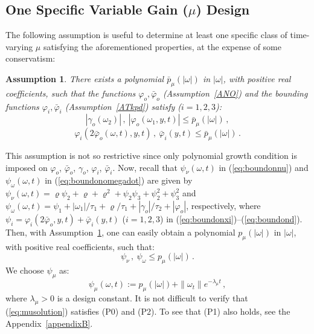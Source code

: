\documentclass{rncauth}
\newtheorem{assumption}{Assumption}
\begin{document}
\subsection{One Specific Variable Gain ($\mu$) Design \label{sec:poly}}

The following assumption is useful to determine at least one
specific class of time-varying $\mu$ satisfying the aforementioned
properties, at the expense of some conservatism:
%
%
\begin{assumption}\label{Amu}
There exists a polynomial $\bar{p}_\mu(|\omega|)$ in $|\omega|$,
with positive real coefficients, such that the functions
$\varphi_o, \bar{\varphi}_o$ (Assumption~\ref{ANO}) and the
bounding functions $\varphi_i, \bar{\varphi}_i$
(Assumption~\ref{ATkpd}) satisfy ($i=1,2,3$):
%
$$|\gamma_o(\omega_2)|\,,\
|\varphi_o(\omega_1,y,t)| \leq \bar{p}_\mu(|\omega|)\,,$$
%
$$\varphi_i(2\bar{\varphi}_o(\omega,t),y,t)\,,\ \bar{\varphi}_i(y,t)\leq \bar{p}_\mu(|\omega|)\,.$$
%
\end{assumption}
%
This assumption is not so restrictive since only polynomial growth
condition is imposed on $\varphi_o$, $\bar{\varphi}_o$,
$\gamma_o$, $\varphi_i$, $\bar{\varphi}_i$.
%
Now, recall that $\psi_\nu(\omega,t)$ in (\ref{eq:boundonnu}) and
$\psi_\omega(\omega,t)$ in (\ref{eq:boundonomegadot}) are given by
$\psi_\nu(\omega,t)=\varrho \psi_2+ \varrho+
\varrho^2+\psi_2\psi_3+\psi_2^2 + \psi_3^2$ and
$\psi_\omega(\omega,t)=\psi_1 + |\omega_1|/\tau_1 + \varrho/\tau_1
+ |\gamma_o|/\tau_2+|\varphi_o|$, respectively, where
$\psi_i=\varphi_i(2\bar{\varphi}_o,y,t)+\bar{\varphi}_i(y,t)$
($i=1,2,3$) in (\ref{eq:boundonxi})--(\ref{eq:boundond}). Then,
with Assumption~\ref{Amu}, one can easily obtain a polynomial
$p_\mu(|\omega|)$ in $|\omega|$, with positive real coefficients,
such that:
%
\begin{equation}
\psi_\nu\,, \ \psi_\omega \leq p_\mu(|\omega|)\,.\label{eq:bound1}
\end{equation}
%
We choose $\psi_\mu$ as:
%
\begin{equation}
\psi_\mu(\omega,t):=p_\mu(|\omega|) +\|\omega_{t}\|
e^{-\lambda_\mu t}\,,\label{eq:musolution}
\end{equation}
%
where $\lambda_\mu\!>\!0$ is a design constant. It is not
difficult to verify that (\ref{eq:musolution}) satisfies (P0) and
(P2). To see that (P1) also holds, see the
Appendix~\ref{appendixB}.




\end{document}
